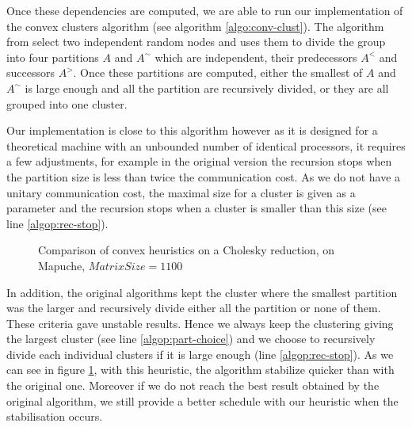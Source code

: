 \documentclass[10pt, conference, compsocconf,pdftex,dvipsnames]{IEEEtran}
\begin{document}
Once these dependencies are computed, we are able to run our implementation of
the convex clusters algorithm (see algorithm \ref{algo:conv-clust}). The
algorithm from \cite{lepere2002new} select two independent random nodes and uses
them to divide the group into four partitions $A$ and $A^{\sim}$ which are
independent, their predecessors $A^<$ and successors $A^>$. Once these
partitions are computed, either the smallest of $A$ and $A^{\sim}$ is large
enough and all the partition are recursively divided, or they are all grouped
into one cluster. 

Our implementation is close to this algorithm however as it is designed for a
theoretical machine with an unbounded number of identical processors, it
requires a few adjustments, for example in the original version the recursion
stops when the partition size is less than twice the communication cost. As we
do not have a unitary communication cost, the maximal size for a cluster is
given as a parameter and the recursion stops when a cluster is smaller than
this size (see line \ref{algop:rec-stop}). 

\begin{figure}[htb]
    \scalebox{0.65}{
        \centering
        
    }


    \caption{Comparison of convex heuristics on a Cholesky reduction, on
    Mapuche, $MatrixSize=1100$}
    \label{fig:Rdt}
\end{figure}

In addition, the original algorithms kept the cluster where the smallest
partition was the larger and recursively divide either all the partition or
none of them. These criteria gave unstable results. Hence we always keep the
clustering giving the largest cluster (see line \ref{algop:part-choice}) and
we choose to recursively divide each individual clusters if it is large enough
(line \ref{algop:rec-stop}). As we can see in figure \ref{fig:Rdt}, with this
heuristic, the algorithm stabilize quicker than with the original one.
Moreover if we do not reach the best result obtained by the original
algorithm, we still provide a better schedule with
our heuristic when the stabilisation occurs.
\end{document}
